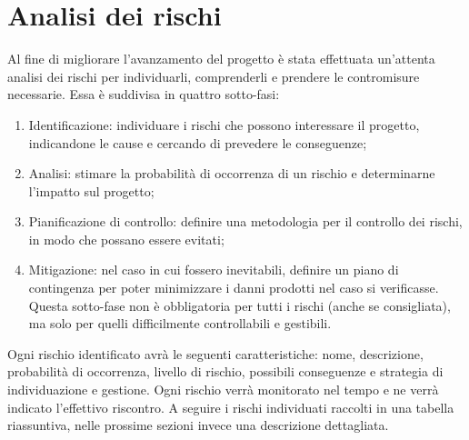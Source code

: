 \documentclass[../PianoProgetto.tex]{subfiles}
\begin{document}
\section{Analisi dei rischi}

	Al fine di migliorare l’avanzamento del progetto è stata effettuata un’attenta analisi dei rischi per individuarli, comprenderli e prendere le contromisure necessarie. Essa è suddivisa in quattro sotto-fasi:
	\begin{enumerate}
	\item Identificazione: individuare i rischi che possono interessare il progetto, indicandone le cause e cercando di prevedere le conseguenze;
	\item Analisi: stimare la probabilità di occorrenza di un rischio e determinarne l’impatto sul progetto;
	\item Pianificazione di controllo: definire una metodologia per il controllo dei rischi, in modo che possano essere evitati;
	\item Mitigazione: nel caso in cui fossero inevitabili, definire un piano di contingenza per poter minimizzare i danni prodotti nel caso si verificasse. Questa sotto-fase non è obbligatoria per tutti i rischi (anche se consigliata), ma solo per quelli difficilmente controllabili e gestibili.
	\end{enumerate}
	Ogni rischio identificato avrà le seguenti caratteristiche: nome, descrizione, probabilità di occorrenza, livello di rischio, possibili conseguenze e strategia di individuazione e gestione. Ogni rischio verrà monitorato nel tempo e ne verrà indicato l’effettivo riscontro. A seguire i rischi individuati raccolti in una tabella riassuntiva, nelle prossime sezioni invece una descrizione dettagliata.	
		
	\newpage
	
\end{document}
